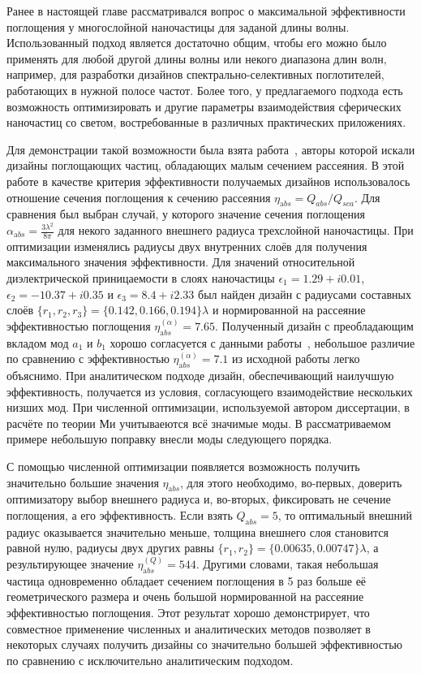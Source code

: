 Ранее в настоящей главе рассматривался вопрос о максимальной
эффективности поглощения у многослойной наночастицы для заданой длины
волны.  Использованный подход является достаточно общим, чтобы
его можно было применять для любой другой длины волны или некого
диапазона длин волн, например, для разработки дизайнов
спектрально-селективных поглотителей, работающих в нужной полосе
частот.  Более того, у предлагаемого подхода есть возможность
оптимизировать и другие параметры взаимодействия сферических
наночастиц со светом, востребованные в различных практических
приложениях.

Для демонстрации такой возможности была взята работа~\cite{Alu-2014},
авторы которой искали дизайны поглощающих частиц, обладающих малым
сечением рассеяния. В этой работе в качестве критерия эффективности
получаемых дизайнов использовалось отношение сечения поглощения к
сечению рассеяния $\eta_{\mathrm abs} = Q_{abs}/Q_{sca}$.  Для
сравнения был выбран случай, у которого значение сечения поглощения
$\alpha_{\mathrm abs}=\frac{3\lambda^2}{8\pi}$ для некого заданного
внешнего радиуса трехслойной наночастицы.  При оптимизации изменялись
радиусы двух внутренних слоёв для получения максимального значения
эффективности.  Для значений относительной диэлектрической
приницаемости в слоях наночастицы $\epsilon_1 = 1.29+i0.01$,
$\epsilon_2 = -10.37+ i0.35$ и $\epsilon_3=8.4+i2.33$ был найден
дизайн с радиусами составных слоёв
$\{r_1, r_2, r_3\}=\{0.142,0.166,0.194\}\lambda$ и нормированной на
рассеяние эффективностью поглощения
$\eta_{\mathrm abs}^{(\alpha)} =7.65$.  Полученный дизайн с
преобладающим вкладом мод $a_1$ и $b_1$ хорошо согласуется с данными
работы~\cite{Alu-2014}, небольшое различие по сравнению с
эффективностью $\eta_{\mathrm abs}^{(\alpha)} =7.1$ из исходной работы
легко объяснимо.  При аналитическом подходе дизайн, обеспечивающий
наилучшую эффективность, получается из условия, согласующего
взаимодействие нескольких низших мод.  При численной оптимизации,
используемой автором диссертации, в расчёте по теории Ми учитываеются
всё значимые моды.  В рассматриваемом примере небольшую поправку
внесли моды следующего порядка.

С помощью численной оптимизации появляется возможность получить
значительно большие значения $\eta_{\mathrm abs}$, для этого
необходимо, во-первых, доверить оптимизатору выбор внешнего радиуса и,
во-вторых, фиксировать не сечение поглощения, а его эффективность.
Если взять $Q_{\mathrm abs} = 5$, то оптимальный внешний радиус
оказывается значительно меньше, толщина внешнего слоя становится
равной нулю, радиусы двух других равны
$\{r_1, r_2\}=\{0.00635,0.00747\}\lambda$, а результирующее значение
$\eta_{\mathrm abs}^{(Q)} =544$.  Другими словами, такая небольшая
частица одновременно обладает сечением поглощения в 5 раз больше её
геометрического размера и очень большой нормированной на рассеяние
эффективностью поглощения. Этот результат хорошо демонстрирует, что
совместное применение численных и аналитических методов позволяет в
некоторых случаях получить дизайны со значительно большей
эффективностью по сравнению с исключительно аналитическим подходом.


